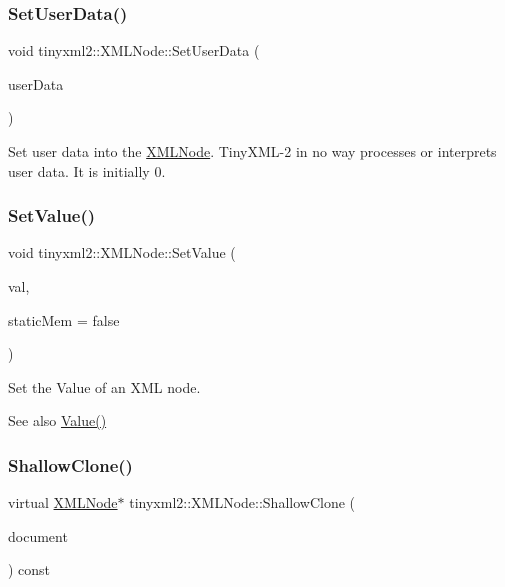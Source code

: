 \subsubsection{\texorpdfstring{Set\+User\+Data()}{SetUserData()}}
{\footnotesize\ttfamily void tinyxml2\+::\+X\+M\+L\+Node\+::\+Set\+User\+Data (\begin{DoxyParamCaption}\item[{void $\ast$}]{user\+Data }\end{DoxyParamCaption})\hspace{0.3cm}{\ttfamily [inline]}}

Set user data into the \mbox{\hyperlink{classtinyxml2_1_1_x_m_l_node}{X\+M\+L\+Node}}. Tiny\+X\+M\+L-\/2 in no way processes or interprets user data. It is initially 0. \mbox{\label{classtinyxml2_1_1_x_m_l_node_a09dd68cf9eae137579f6e50f36487513}} 
\subsubsection{\texorpdfstring{Set\+Value()}{SetValue()}}
{\footnotesize\ttfamily void tinyxml2\+::\+X\+M\+L\+Node\+::\+Set\+Value (\begin{DoxyParamCaption}\item[{const char $\ast$}]{val,  }\item[{bool}]{static\+Mem = {\ttfamily false} }\end{DoxyParamCaption})}

Set the Value of an X\+ML node. \begin{DoxySeeAlso}{See also}
\mbox{\hyperlink{classtinyxml2_1_1_x_m_l_node_a0485e51c670e741884cfd8362274d680}{Value()}} 
\end{DoxySeeAlso}
\mbox{\label{classtinyxml2_1_1_x_m_l_node_a8402cbd3129d20e9e6024bbcc0531283}} 
\subsubsection{\texorpdfstring{Shallow\+Clone()}{ShallowClone()}}
{\footnotesize\ttfamily virtual \mbox{\hyperlink{classtinyxml2_1_1_x_m_l_node}{X\+M\+L\+Node}}$\ast$ tinyxml2\+::\+X\+M\+L\+Node\+::\+Shallow\+Clone (\begin{DoxyParamCaption}\item[{\mbox{\hyperlink{classtinyxml2_1_1_x_m_l_document}{X\+M\+L\+Document}} $\ast$}]{document }\end{DoxyParamCaption}) const\hspace{0.3cm}{\ttfamily [pure virtual]}}


